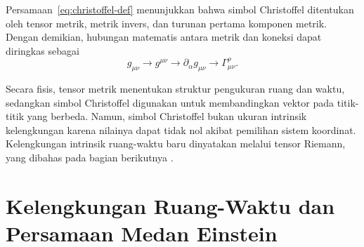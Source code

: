 Persamaan~\eqref{eq:christoffel-def} menunjukkan bahwa simbol
Christoffel ditentukan oleh tensor metrik, metrik invers, dan turunan
pertama komponen metrik. Dengan demikian, hubungan matematis antara
metrik dan koneksi dapat diringkas sebagai
\begin{equation}
    g_{\mu\nu}
    \longrightarrow
    g^{\mu\nu}
    \longrightarrow
    \partial_\alpha g_{\mu\nu}
    \longrightarrow
    \Gamma^\rho_{\mu\nu}.
\end{equation}

Secara fisis, tensor metrik menentukan struktur pengukuran ruang dan
waktu, sedangkan simbol Christoffel digunakan untuk membandingkan
vektor pada titik-titik yang berbeda. Namun, simbol Christoffel bukan
ukuran intrinsik kelengkungan karena nilainya dapat tidak nol akibat
pemilihan sistem koordinat. Kelengkungan intrinsik ruang-waktu baru
dinyatakan melalui tensor Riemann, yang dibahas pada bagian berikutnya
\parencite{Schutz2009FirstCourse,Carroll2004SpacetimeGeometry}.


\section{Kelengkungan Ruang-Waktu dan Persamaan Medan Einstein}
\label{sec:kelengkungan-efe}

